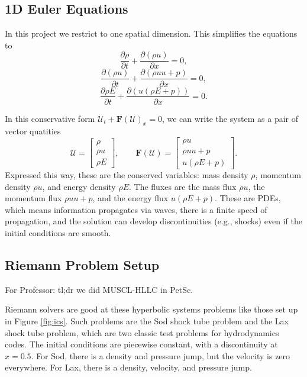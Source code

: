 \documentclass[12pt]{article}
\begin{document}
\subsection{1D Euler Equations}
In this project we restrict to one spatial dimension. This simplifies the equations to
\begin{equation}
    \frac{\partial \rho}{\partial t} + \frac{\partial (\rho u)}{\partial x} = 0,
\end{equation}
\begin{equation}
    \frac{\partial (\rho u)}{\partial t} + \frac{\partial (\rho u u + p)}{\partial x} = 0,
\end{equation}
\begin{equation}
    \frac{\partial \rho E}{\partial t} + \frac{\partial (u(\rho E + p))}{\partial x} = 0.
\end{equation}

In this conservative form $\mathcal{U}_t + \mathbf{F}(\mathcal{U})_x = 0$, we can write the system as a pair of vector quatities
\begin{equation}
    \mathcal{U} = \begin{bmatrix}
        \rho \\
        \rho u \\
        \rho E
    \end{bmatrix},
    \qquad
    \mathbf{F} (\mathcal{U}) = \begin{bmatrix}
        \rho u \\
        \rho u u + p \\
        u(\rho E + p)
    \end{bmatrix}.
\end{equation}
Expressed this way, these are the conserved variables: mass density $\rho$, momentum density $\rho u$, and energy density $\rho E$. The fluxes are the mass flux $\rho u$, the momentum flux $\rho u u + p$, and the energy flux $u(\rho E + p)$. These are PDEs, which means information propagates via waves, there is a finite speed of propagation, and the solution can develop discontinuities (e.g., shocks) even if the initial conditions are smooth. 

\subsection{Riemann Problem Setup}

For Professor: tl;dr we did MUSCL-HLLC in PetSc.

Riemann solvers are good at these hyperbolic systems problems like those set up in Figure \ref{fig:ics}. Such problems are the Sod shock tube problem and the Lax shock tube problem, which are two classic test problems for hydrodynamics codes. The initial conditions are piecewise constant, with a discontinuity at $x = 0.5$. For Sod, there is a density and pressure jump, but the velocity is zero everywhere. For Lax, there is a density, velocity, and pressure jump.  
\end{document}
